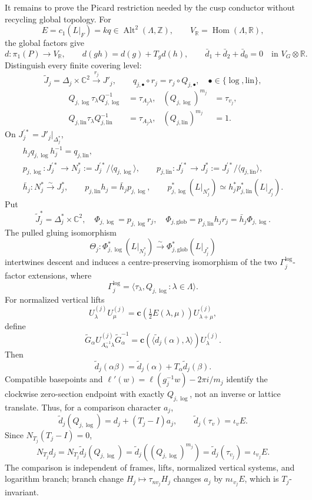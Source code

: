 \documentclass[10pt,letterpaper]{article}
\begin{document}
It remains to prove the Picard restriction needed by the cusp conductor
without recycling global topology.  For
\[
 E=c_1(L|_F)=kq\in\operatorname{Alt}^2(\Lambda,\mathbb Z),\qquad
 V_{\mathbb R}=\operatorname{Hom}(\Lambda,\mathbb R),
\]
the global factors give
\[
 d:\pi_1(P)\to V_{\mathbb R},\qquad
 d(gh)=d(g)+T_gd(h),\qquad
 \bar d_1+\bar d_2+\bar d_0=0\quad\text{in }V_G\otimes\mathbb R.
\]
Distinguish every finite covering level:
\[
 \widetilde J_j=\Delta_j\times\mathbb C^2
 \xrightarrow{\,r_j\,}J'_j,\qquad
 q_{j,\bullet}\circ r_j=r_j\circ Q_{j,\bullet},
 \quad \bullet\in\{\log,\mathrm{lin}\},
\]
\[
 \begin{aligned}
 Q_{j,\log}\tau_\lambda Q_{j,\log}^{-1}&=\tau_{A_j\lambda},&
 (Q_{j,\log})^{m_j}&=\tau_{v_j},\\
 Q_{j,\mathrm{lin}}\tau_\lambda Q_{j,\mathrm{lin}}^{-1}
 &=\tau_{A_j\lambda},&
 (Q_{j,\mathrm{lin}})^{m_j}&=1.
 \end{aligned}
\]
On $J_j^{\prime *}=J'_j|_{\Delta_j^*}$,
\[
 \begin{gathered}
 h_jq_{j,\log}h_j^{-1}=q_{j,\mathrm{lin}},\\
 p_{j,\log}:J_j^{\prime *}\to
 N_j^*:=J_j^{\prime *}/\langle q_{j,\log}\rangle,\qquad
 p_{j,\mathrm{lin}}:J_j^{\prime *}\to
 J_j^*:=J_j^{\prime *}/\langle q_{j,\mathrm{lin}}\rangle,\\
 \bar h_j:N_j^*\xrightarrow{\sim}J_j^*,\qquad
 p_{j,\mathrm{lin}}h_j=\bar h_jp_{j,\log},\qquad
 p_{j,\log}^*(L|_{N_j^*})
 \simeq h_j^*p_{j,\mathrm{lin}}^*(L|_{J_j^*}).
 \end{gathered}
\]
Put
\[
 \widetilde J_j^*=\Delta_j^*\times\mathbb C^2,\quad
 \Phi_{j,\log}=p_{j,\log}r_j,\quad
 \Phi_{j,\mathrm{glob}}=p_{j,\mathrm{lin}}h_jr_j
 =\bar h_j\Phi_{j,\log}.
\]
The pulled gluing isomorphism
\[
 \Theta_j:\Phi_{j,\log}^*(L|_{N_j^*})
 \xrightarrow{\sim}\Phi_{j,\mathrm{glob}}^*(L|_{J_j^*})
\]
intertwines descent and induces a centre-preserving isomorphism of the two
$\Gamma_j^{\log}$-factor extensions, where
\[
 \Gamma_j^{\log}=
 \langle\tau_\lambda,Q_{j,\log}:\lambda\in\Lambda\rangle.
\]
For normalized vertical lifts
\[
 U_\lambda^{(j)}U_\mu^{(j)}
 =\mathbf c\!\left(\tfrac12E(\lambda,\mu)\right)U_{\lambda+\mu}^{(j)},
\]
define
\[
 \widetilde G_\alpha U_{A_\alpha^{-1}\lambda}^{(j)}
 \widetilde G_\alpha^{-1}
 =\mathbf c(\langle\widetilde d_j(\alpha),\lambda\rangle)
 U_\lambda^{(j)}.
 \tag{5.17-A14c}
\]
Then
\[
 \widetilde d_j(\alpha\beta)=
 \widetilde d_j(\alpha)+T_\alpha\widetilde d_j(\beta).
\]
Compatible basepoints and
$\ell'(w)=\ell(g_j^{-1}w)-2\pi i/m_j$ identify the clockwise zero-section
endpoint with exactly $Q_{j,\log}$, not an inverse or lattice translate.
Thus, for a comparison character $a_j$,
\[
 \widetilde d_j(Q_{j,\log})=d_j+(T_j-I)a_j,\qquad
 \widetilde d_j(\tau_v)=\iota_vE.
\]
Since $N_{T_j}(T_j-I)=0$,
\[
 N_{T_j}d_j
 =N_{T_j}\widetilde d_j(Q_{j,\log})
 =\widetilde d_j((Q_{j,\log})^{m_j})
 =\widetilde d_j(\tau_{v_j})
 =\iota_{v_j}E.
 \tag{5.17-A15}
\]
The comparison is independent of frames, lifts, normalized vertical
systems, and logarithm branch; branch change
$H_j\mapsto\tau_{nv_j}H_j$ changes $a_j$ by
$n\iota_{v_j}E$, which is $T_j$-invariant.
\end{document}
